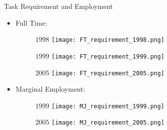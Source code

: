 \documentclass{beamer}
\begin{document}
\begin{frame}{Task Requirement and Employment}
\begin{itemize}
\item Full Time:
\begin{figure}
\begin{minipage}[b]{0.3\textwidth}{$1998$}
\centering
\texttt{[image: FT\_requirement\_1998.png]}
\end{minipage}
\begin{minipage}[b]{0.3\textwidth}{$1999$}
\centering
\texttt{[image: FT\_requirement\_1999.png]}
\end{minipage}
\begin{minipage}[b]{0.3\textwidth}{$2005$}
\centering
\texttt{[image: FT\_requirement\_2005.png]}
\end{minipage}
\end{figure}
\item Marginal Employment:
\begin{figure}
\begin{minipage}[b]{0.3\textwidth}{$1999$}
\centering
\texttt{[image: MJ\_requirement\_1999.png]}
\end{minipage}
\begin{minipage}[b]{0.3\textwidth}{$2005$}
\centering
\texttt{[image: MJ\_requirement\_2005.png]}
\end{minipage}
\end{figure}
\end{itemize}
\end{frame}
\end{document}
